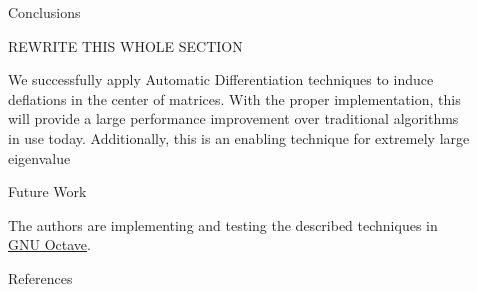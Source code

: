 \documentclass[final]{beamer}
\newlength{\sepwid}
\newlength{\onecolwid}
\newlength{\twocolwid}
\begin{document}
\begin{frame}[t]
\begin{columns}[t]
\begin{column}{\twocolwid}
\end{column} %

\begin{column}{\sepwid}\end{column} %

\begin{column}{\onecolwid} %


\begin{block}{Conclusions}

REWRITE THIS WHOLE SECTION

We successfully apply Automatic Differentiation techniques to induce deflations
in the center of matrices. With the proper implementation, this will provide a
large performance improvement over traditional algorithms in use today.
Additionally, this is an enabling technique for extremely large eigenvalue

\end{block}


\begin{block}{Future Work}

The authors are implementing and testing the described techniques in
\href{http://octave.org/}{GNU Octave}.

\end{block}


\begin{block}{References}

\small{
\vspace{0.75in}}


\end{block}
\end{column}
\end{columns}
\end{frame}
\end{document}
